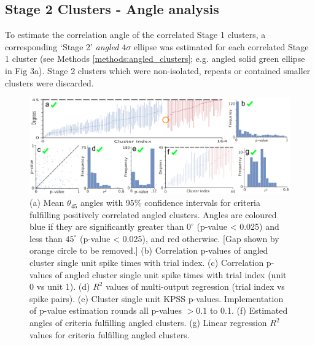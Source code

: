 \documentclass{article}
\begin{document}


\subsection*{Stage 2 Clusters - Angle analysis}
\label{results:cluster_angle}

To estimate the correlation angle of the correlated Stage 1 clusters, a corresponding `Stage 2' \textit{angled} $4\sigma$ ellipse was estimated for each correlated Stage 1 cluster (see Methods \ref{methods:angled_clusters}; e.g. angled solid green ellipse in Fig 3a). Stage 2 clusters which were non-isolated, repeats or contained smaller clusters were discarded. 




\begin{figure}[t!]
\centering
\includegraphics[width=\textwidth]{Figure4.pdf}
\caption{(a) Mean $\theta_{45}$ angles with 95\% confidence intervals for criteria fulfilling positively correlated angled clusters. Angles are coloured blue if they are significantly greater than $0^{\circ}$ (p-value < 0.025) and less than $45^{\circ}$ (p-value < 0.025), and red otherwise. [Gap shown by orange circle to be removed.] (b) Correlation p-values of angled cluster single unit spike times with trial index. (c) Correlation p-values of angled cluster single unit spike times with trial index (unit 0 vs unit 1). (d) $R^2$ values of multi-output regression (trial index vs spike pairs). (e) Cluster single unit KPSS p-values. Implementation of p-value estimation rounds all p-values $>0.1$ to 0.1. (f) Estimated angles of criteria fulfilling angled clusters. (g) Linear regression $R^2$ values for criteria fulfilling angled clusters.}
\label{fig:universe}
\end{figure}
\end{document}
